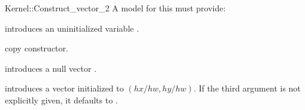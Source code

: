 \begin{ccRefFunctionObjectConcept}{Kernel::Construct_vector_2}
A model for this must provide:



\ccHidden{}
             {introduces an uninitialized variable .}

\ccHidden {}
 	    {copy constructor.}

 	    {introduces a null vector .}

            {introduces a vector  initialized to $(hx/hw,hy/hw)$.
             If the third argument is not explicitly given, it defaults
             to .
             \ccPrecond {} }

\end{ccRefFunctionObjectConcept}

